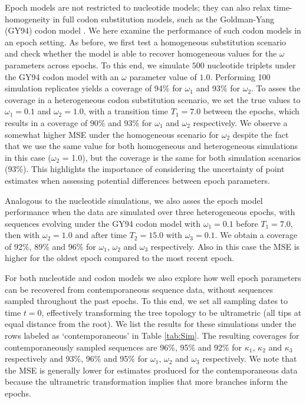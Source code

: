 Epoch models are not restricted to nucleotide models; they can also relax time-homogeneity in full codon substitution models, such as the Goldman-Yang (GY94) codon model \citep{Goldman1994}.
We here examine the performance of such codon models in an epoch setting. 
As before, we first test a homogeneous substitution scenario and check whether the model is able to recover homogeneous values for the $\omega$ parameters across epochs. 
To this end, we simulate $500$ nucleotide triplets under the GY94 codon model with an $\omega$ parameter value of $1.0$. 
Performing 100 simulation replicates yields a coverage of 94\% for $\omega_{1}$ and 93\% for $\omega_{2}$. 
To asses the coverage in a heterogeneous codon substitution scenario, we set the true values to $\omega_{1}=0.1$ and $\omega_{2}=1.0$, with a transition time $T_{1}=7.0$ between the epochs, which results in a coverage of 90\% and 93\% for $\omega_{1}$ and $\omega_{2}$ respectively.
We observe a somewhat higher MSE under the homogeneous scenario for $\omega_{2}$ despite the fact that we use the same value for both homogeneous and heterogeneous simulations in this case ($\omega_{2}$  = 1.0), but the coverage is the same for both simulation scenarios (93\%).
This highlights the importance of considering the uncertainty of point estimates when assessing potential differences between epoch parameters.

Analogous to the nucleotide simulations, we also asses the epoch model performance when the data are simulated over three heterogeneous epochs, with sequences evolving under the GY94 codon model with $\omega_{1}=0.1$ before $T_{1}=7.0$, then with $\omega_{2}=1.0$ and after time $T_{2}=15.0$ with $\omega_{3}=0.1$. 
We obtain a coverage of 92\%, 89\% and 96\% for $\omega_{1}$, $\omega_{2}$ and $\omega_{3}$ respectively.
Also in this case the MSE is higher for the oldest epoch compared to the most recent epoch.

For both nucleotide and codon models we also explore how well epoch parameters can be recovered from contemporaneous sequence data, without sequences sampled throughout the past epochs.
To this end,  we set all sampling dates to time $t = 0$, effectively transforming the tree topology to be ultrametric (all tips at equal distance from the root).
We list the results for these simulations under the rows labeled as `contemporaneous' in Table \ref{tab:Sim}. 
The resulting coverages for contemporaneously sampled sequences are 96\%, 95\% and 92\% for $\kappa_{1}$, $\kappa_{2}$ and $\kappa_{3}$ respectively and 93\%, 96\% and 95\% for $\omega_{1}$, $\omega_{2}$ and $\omega_{3}$  respectively.
We note that the MSE is generally lower for estimates produced for the contemporaneous data because the ultrametric transformation implies that more branches inform the epochs.

